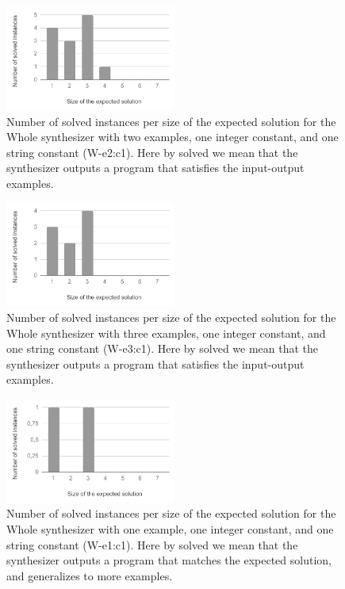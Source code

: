 \begin{figure}
  \centering
  \includegraphics[width=0.5\textwidth]{assets/bar-chart-solved-W-e2-c1.pdf}
  \caption{Number of solved instances per size of the expected solution for
    the Whole synthesizer with two examples, one integer constant, and one
    string constant (W-e2:c1). Here by solved we mean that the synthesizer
    outputs a program that satisfies the input-output examples.}
  \label{fig:bar-chart-solved-W-e2-c1}
\end{figure}

\begin{figure}
  \centering
  \includegraphics[width=0.5\textwidth]{assets/bar-chart-solved-W-e3-c1.pdf}
  \caption{Number of solved instances per size of the expected solution for
    the Whole synthesizer with three examples, one integer constant, and one
    string constant (W-e3:c1). Here by solved we mean that the synthesizer
    outputs a program that satisfies the input-output examples.}
  \label{fig:bar-chart-solved-W-e3-c1}
\end{figure}

\begin{figure}
  \centering
  \includegraphics[width=0.5\textwidth]{assets/bar-chart-expected-W-e1-c1.pdf}
  \caption{Number of solved instances per size of the expected solution for
    the Whole synthesizer with one example, one integer constant, and one
    string constant (W-e1:c1). Here by solved we mean that the synthesizer
    outputs a program that matches the expected solution, and generalizes to
    more examples.}
  \label{fig:bar-chart-expected-W-e1-c1}
\end{figure}

